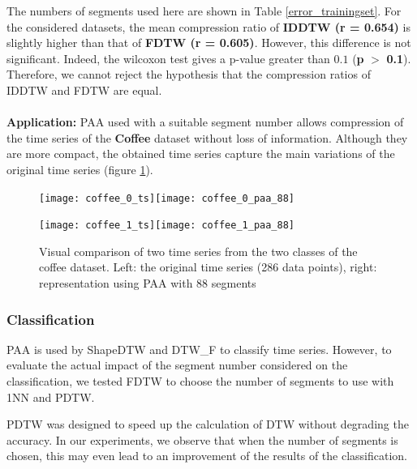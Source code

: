 The numbers of segments used here are shown in Table \ref{error_trainingset}. For the considered datasets, the mean compression ratio of \textbf{IDDTW (r = 0.654)}  is slightly higher than that
of \textbf{FDTW (r = 0.605)}. However, this difference is not significant. Indeed, the wilcoxon test
gives a p-value greater than $0.1$ (\textbf{p} $>$ \textbf{0.1}). Therefore, we cannot reject the hypothesis that the
compression ratios of IDDTW and FDTW are equal.
\\

\paragraph{}\textbf{Application: } 
PAA used with a suitable segment number allows compression of the time series of
the \textbf{Coffee} dataset without loss of information. Although they are more compact, the obtained time series
capture the main variations of the original time series (figure \ref{coffee}).

\begin{figure}
\center

\texttt{[image: coffee\_0\_ts]}\texttt{[image: coffee\_0\_paa\_88]}

\texttt{[image: coffee\_1\_ts]}\texttt{[image: coffee\_1\_paa\_88]}

\caption{Visual comparison of two time series from the two classes of the coffee dataset. Left: the original time series (286 data points), right:  representation using PAA with 88 segments}

\label{coffee}
\end{figure}


\subsubsection{Classification}

PAA is used by ShapeDTW \cite{zhao2016shapedtw} and DTW\_F \cite{Kate2016} to classify time series. However, to evaluate the actual impact of the segment number considered on the classification, we tested FDTW to choose the
number of segments to use with 1NN and PDTW. 


PDTW was designed to speed up the calculation of DTW without degrading the accuracy. In our experiments, we observe that when the number of segments is chosen, this may even lead to an improvement of the results of the classification.




